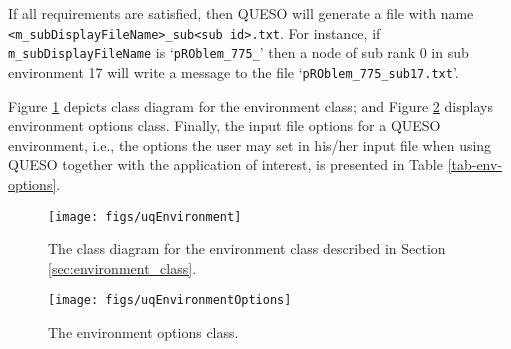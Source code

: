 If all requirements are satisfied, then QUESO will generate a file with name \linebreak 
\verb+<m_subDisplayFileName>_sub<sub id>.txt+.   For instance, if \verb+m_subDisplayFileName+ is `\verb+pROblem_775_+' then a node of sub rank 0 in sub environment 17 will write a message to the file `\verb+pROblem_775_sub17.txt+'.

Figure \ref{fig-env-class} depicts class diagram for the environment class; and Figure  \ref{fig-env-options-class} displays environment options class.%
 Finally, the input file options for a QUESO environment, i.e., the options the user may set in his/her input file when using QUESO together with the application of interest, is presented in Table \ref{tab-env-options}.

\begin{figure}[!hp]
\centering
\texttt{[image: figs/uqEnvironment]}
\vspace*{-24pt}
\caption{The class diagram for the environment class described in Section \ref{sec:environment_class}.}
\label{fig-env-class}
\end{figure}

\begin{figure}[htpb]
\centering
\texttt{[image: figs/uqEnvironmentOptions]}
\vspace*{-8pt}
\caption{The environment options class.}
\label{fig-env-options-class}
\end{figure}



